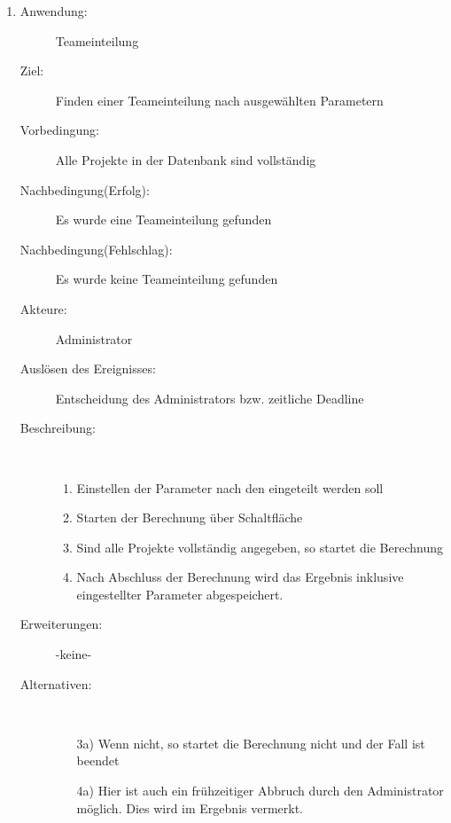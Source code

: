 \documentclass[parskip=full]{scrartcl}
\newcommand{\swtLabel}[1]{\textbf{\textbackslash #1\arabic*0\textbackslash}}
\begin{document}
\begin{enumerate} [label=\swtLabel{A}]
  
  \item
  \begin{description}
  \item[Anwendung:] Teameinteilung
  \item[Ziel:] Finden einer Teameinteilung nach ausgewählten Parametern
  	\item[Vorbedingung:] Alle Projekte in der Datenbank sind vollständig
  	\item[Nachbedingung(Erfolg):] Es wurde eine Teameinteilung gefunden
  	\item[Nachbedingung(Fehlschlag):] Es wurde keine Teameinteilung gefunden
  	\item[Akteure:] Administrator
  	\item[Auslösen des Ereignisses:] Entscheidung des Administrators bzw.
  	zeitliche Deadline
  	\item[Beschreibung:]~
  	\begin{enumerate} 
  	  \item Einstellen der Parameter nach den eingeteilt werden soll
  	  \item Starten der Berechnung über Schaltfläche
  	  \item Sind alle Projekte vollständig angegeben, so startet die Berechnung
  	  \item Nach Abschluss der Berechnung wird das Ergebnis inklusive
  	  eingestellter Parameter abgespeichert.
  	\end{enumerate}
  	\item[Erweiterungen:] -keine-
  	\item[Alternativen:] ~
  	\begin{enumerate}
  	  \item[3a)] Wenn nicht, so startet die Berechnung nicht und der Fall ist
  	  beendet
  	  \item[4a)] Hier ist auch ein frühzeitiger Abbruch durch den Administrator
  	  möglich. Dies wird im Ergebnis vermerkt.
  	 \end{enumerate}  
  \end{description}
   

\end{enumerate}
\end{document}
